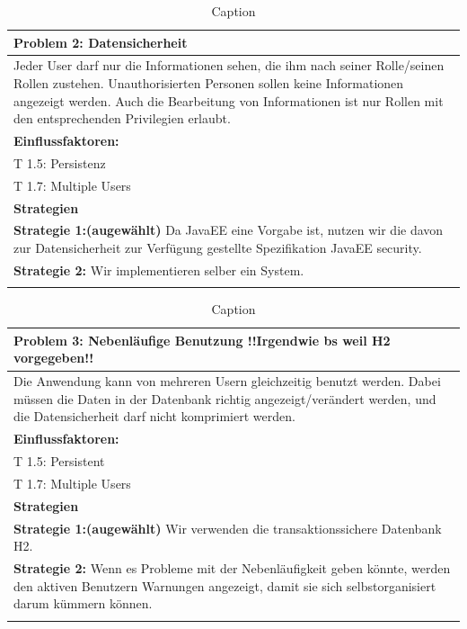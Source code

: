 \documentclass[enabledeprecatedfontcommands,fontsize=12pt,paper=a4,twoside]{scrartcl}
\begin{document}
\begin{table}[]
    \centering
    \begin{tabular}{|p{15cm}|}
    \hline
          \textbf{Problem 2:} Datensicherheit \\ \hline
          Jeder User darf nur die Informationen sehen, die ihm nach seiner Rolle/seinen Rollen zustehen. Unauthorisierten Personen sollen keine Informationen angezeigt werden. Auch die Bearbeitung von Informationen ist nur Rollen mit den entsprechenden Privilegien erlaubt. \\ \hline
          \textbf{Einflussfaktoren: } \\
          T 1.5: Persistenz \\
          T 1.7: Multiple Users\\
          \hline
          \textbf{Strategien} \\ \hline
          \textbf{Strategie 1:(augewählt)} Da JavaEE eine Vorgabe ist, nutzen wir die davon zur Datensicherheit zur Verfügung gestellte Spezifikation JavaEE security.\\
          \textbf{Strategie 2:} Wir implementieren selber ein System. \\
          \\ \hline
    \end{tabular}

    \caption{Caption}
    \label{tab:my_label}
\end{table}

\begin{table}[]
    \centering
    \begin{tabular}{|p{15cm}|}
    \hline
          \textbf{Problem 3:} Nebenläufige Benutzung !!Irgendwie bs weil H2 vorgegeben!!  \\ \hline
          Die Anwendung kann von mehreren Usern gleichzeitig benutzt werden. Dabei müssen die Daten in der Datenbank richtig angezeigt/verändert werden, und die Datensicherheit darf nicht komprimiert werden. \\ \hline
          \textbf{Einflussfaktoren: } \\
          T 1.5: Persistent \\
          T 1.7: Multiple Users\\
          \hline
          \textbf{Strategien} \\ \hline
          \textbf{Strategie 1:(augewählt)} Wir verwenden die transaktionssichere Datenbank H2. \\
          \textbf{Strategie 2:} Wenn es Probleme mit der Nebenläufigkeit geben könnte, werden den aktiven Benutzern Warnungen angezeigt, damit sie sich selbstorganisiert darum kümmern können. \\
          \\ \hline
    \end{tabular}

    \caption{Caption}
    \label{tab:my_label}
\end{table}
\end{document}
